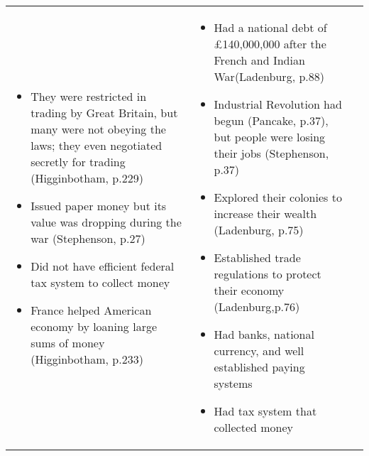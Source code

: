 \begin{singlespace}
\begin{xtabular}{lp{2.7in}p{2.7in}}
\begin{itemize}[nolistsep,leftmargin=*]
	     \item They were restricted in trading by Great Britain, but many were not obeying the laws; they even negotiated secretly for trading (Higginbotham, p.229)
	     \item Issued paper money but its value  was dropping during the war (Stephenson, p.27)
	     \item Did not have efficient federal tax system to collect money 
	     \item France helped American economy by loaning large sums of money (Higginbotham, p.233)
	\end{itemize}
	&
	\begin{itemize}[nolistsep,leftmargin=*]
	    \item Had a national debt of £140,000,000 after the French and Indian War(Ladenburg, p.88) 
	    \item Industrial Revolution had begun (Pancake, p.37), but people were losing their jobs (Stephenson, p.37) 
	    \item Explored their colonies to increase their wealth (Ladenburg, p.75) 
	    \item Established trade regulations to protect their economy (Ladenburg,p.76) 
	    \item Had banks, national currency, and well established paying systems 
	    \item Had tax system that collected money 
	\end{itemize}\NN{}
	\end{xtabular}
\end{singlespace}
%
